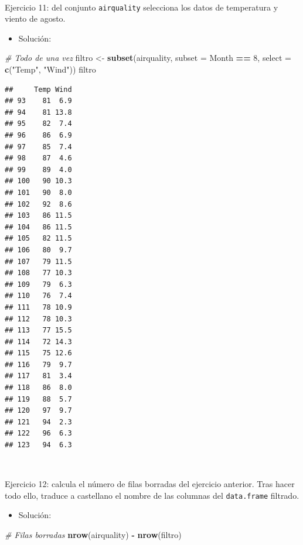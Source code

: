 \documentclass[11pt,]{book}
\newenvironment{Shaded}{\begin{snugshade}}{\end{snugshade}}
\newcommand{\CommentTok}[1]{\textcolor[rgb]{0.37,0.37,0.37}{\textit{#1}}}
\newcommand{\DataTypeTok}[1]{\textcolor[rgb]{0.27,0.27,0.27}{#1}}
\newcommand{\DecValTok}[1]{\textcolor[rgb]{0.06,0.06,0.06}{#1}}
\newcommand{\KeywordTok}[1]{\textcolor[rgb]{0.27,0.27,0.27}{\textbf{#1}}}
\newcommand{\NormalTok}[1]{#1}
\newcommand{\OperatorTok}[1]{\textcolor[rgb]{0.43,0.43,0.43}{\textbf{#1}}}
\newcommand{\StringTok}[1]{\textcolor[rgb]{0.5,0.5,0.5}{#1}}
\providecommand{\tightlist}{%
  \setlength{\itemsep}{0pt}\setlength{\parskip}{0pt}}
\begin{document}
~

Ejercicio 11: del conjunto \texttt{airquality} selecciona los datos de temperatura y viento de agosto.

\begin{itemize}
\tightlist
\item
  Solución:
\end{itemize}

\begin{Shaded}
\begin{Highlighting}[]
\CommentTok{# Todo de una vez}
\NormalTok{filtro <-}\StringTok{ }\KeywordTok{subset}\NormalTok{(airquality, }\DataTypeTok{subset =}\NormalTok{ Month }\OperatorTok{==}\StringTok{ }\DecValTok{8}\NormalTok{,}
                 \DataTypeTok{select =} \KeywordTok{c}\NormalTok{(}\StringTok{"Temp"}\NormalTok{, }\StringTok{"Wind"}\NormalTok{))}
\NormalTok{filtro}
\end{Highlighting}
\end{Shaded}

\begin{verbatim}
##     Temp Wind
## 93    81  6.9
## 94    81 13.8
## 95    82  7.4
## 96    86  6.9
## 97    85  7.4
## 98    87  4.6
## 99    89  4.0
## 100   90 10.3
## 101   90  8.0
## 102   92  8.6
## 103   86 11.5
## 104   86 11.5
## 105   82 11.5
## 106   80  9.7
## 107   79 11.5
## 108   77 10.3
## 109   79  6.3
## 110   76  7.4
## 111   78 10.9
## 112   78 10.3
## 113   77 15.5
## 114   72 14.3
## 115   75 12.6
## 116   79  9.7
## 117   81  3.4
## 118   86  8.0
## 119   88  5.7
## 120   97  9.7
## 121   94  2.3
## 122   96  6.3
## 123   94  6.3
\end{verbatim}

~

Ejercicio 12: calcula el número de filas borradas del ejercicio anterior. Tras hacer todo ello, traduce a castellano el nombre de las columnas del \texttt{data.frame} filtrado.

\begin{itemize}
\tightlist
\item
  Solución:
\end{itemize}

\begin{Shaded}
\begin{Highlighting}[]
\CommentTok{# Filas borradas}
\KeywordTok{nrow}\NormalTok{(airquality) }\OperatorTok{-}\StringTok{ }\KeywordTok{nrow}\NormalTok{(filtro)}
\end{Highlighting}
\end{Shaded}
\end{document}
